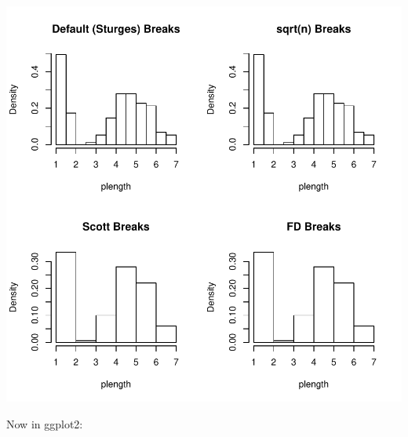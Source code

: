 \documentclass[12pt,letterpaper,final]{article}
\begin{document}
\includegraphics{lect_main-004}

Now in ggplot2:
\end{document}
